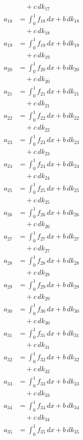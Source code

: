 \documentclass{article}
\begin{document}
\begin{align}
&\quad + c\,dk_{17} \\
a_{18} &= \int_0^1 f_{18}\,dx + b\,dk_{18} \\
&\quad + c\,dk_{18} \\
a_{19} &= \int_0^1 f_{19}\,dx + b\,dk_{19} \\
&\quad + c\,dk_{19} \\
a_{20} &= \int_0^1 f_{20}\,dx + b\,dk_{20} \\
&\quad + c\,dk_{20} \\
a_{21} &= \int_0^1 f_{21}\,dx + b\,dk_{21} \\
&\quad + c\,dk_{21} \\
a_{22} &= \int_0^1 f_{22}\,dx + b\,dk_{22} \\
&\quad + c\,dk_{22} \\
a_{23} &= \int_0^1 f_{23}\,dx + b\,dk_{23} \\
&\quad + c\,dk_{23} \\
a_{24} &= \int_0^1 f_{24}\,dx + b\,dk_{24} \\
&\quad + c\,dk_{24} \\
a_{25} &= \int_0^1 f_{25}\,dx + b\,dk_{25} \\
&\quad + c\,dk_{25} \\
a_{26} &= \int_0^1 f_{26}\,dx + b\,dk_{26} \\
&\quad + c\,dk_{26} \\
a_{27} &= \int_0^1 f_{27}\,dx + b\,dk_{27} \\
&\quad + c\,dk_{27} \\
a_{28} &= \int_0^1 f_{28}\,dx + b\,dk_{28} \\
&\quad + c\,dk_{28} \\
a_{29} &= \int_0^1 f_{29}\,dx + b\,dk_{29} \\
&\quad + c\,dk_{29} \\
a_{30} &= \int_0^1 f_{30}\,dx + b\,dk_{30} \\
&\quad + c\,dk_{30} \\
a_{31} &= \int_0^1 f_{31}\,dx + b\,dk_{31} \\
&\quad + c\,dk_{31} \\
a_{32} &= \int_0^1 f_{32}\,dx + b\,dk_{32} \\
&\quad + c\,dk_{32} \\
a_{33} &= \int_0^1 f_{33}\,dx + b\,dk_{33} \\
&\quad + c\,dk_{33} \\
a_{34} &= \int_0^1 f_{34}\,dx + b\,dk_{34} \\
&\quad + c\,dk_{34} \\
a_{35} &= \int_0^1 f_{35}\,dx + b\,dk_{35} \\

\end{align}
\end{document}
